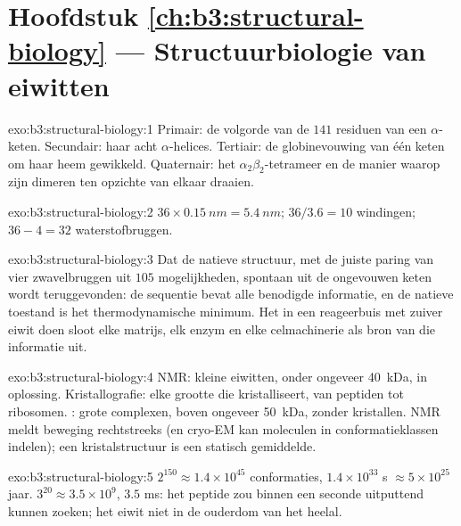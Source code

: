 \section*{Hoofdstuk \ref{ch:b3:structural-biology} --- Structuurbiologie van eiwitten}

\begin{solution}{exo:b3:structural-biology:1}
Primair: de volgorde van de $141$ residuen van een $\alpha$-keten.
Secundair: haar acht $\alpha$-helices. Tertiair: de globinevouwing van
één keten om haar heem gewikkeld. Quaternair: het
$\alpha_{2}\beta_{2}$-tetrameer en de manier waarop zijn dimeren ten
opzichte van elkaar draaien.
\end{solution}

\begin{solution}{exo:b3:structural-biology:2}
$36\times \qty{0.15}{nm} = \qty{5.4}{nm}$; $36/3.6 = 10$ windingen;
$36 - 4 = 32$ waterstofbruggen.
\end{solution}

\begin{solution}{exo:b3:structural-biology:3}
Dat de natieve structuur, met de juiste paring van vier zwavelbruggen
uit $105$ mogelijkheden, spontaan uit de ongevouwen keten wordt
teruggevonden: de sequentie bevat alle benodigde informatie, en de
natieve toestand is het thermodynamische minimum. Het in een
reageerbuis met zuiver eiwit doen sloot elke matrijs, elk enzym en elke
celmachinerie als bron van die informatie uit.
\end{solution}

\begin{solution}{exo:b3:structural-biology:4}
NMR: kleine eiwitten, onder ongeveer \qty{40}{kDa}, in oplossing.
Kristallografie: elke grootte die kristalliseert, van peptiden tot
ribosomen. : grote complexen, boven ongeveer
\qty{50}{kDa}, zonder kristallen. NMR meldt beweging rechtstreeks (en
cryo-EM kan moleculen in conformatieklassen indelen); een
kristalstructuur is een statisch gemiddelde.
\end{solution}

\begin{solution}{exo:b3:structural-biology:5}
$2^{150} \approx 1.4\times 10^{45}$ conformaties, $1.4\times 10^{33}$
s $\approx 5\times 10^{25}$ jaar. $3^{20} \approx 3.5\times 10^{9}$,
$3.5$ ms: het peptide zou binnen een seconde uitputtend kunnen zoeken;
het eiwit niet in de ouderdom van het heelal.
\end{solution}


